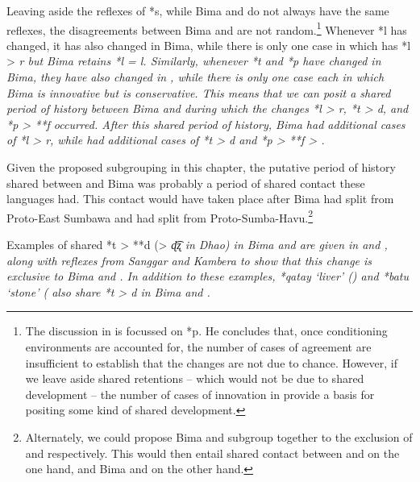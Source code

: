 Leaving aside the reflexes of *s,
while Bima and  do not always have the same reflexes,
the disagreements between Bima
and  are not random.\footnote{
		The discussion in \citet[93f]{Blust2008}
		is focussed on *p.
		He concludes that, once conditioning environments are accounted
		for, the number of cases of agreement are insufficient to establish
		that the changes are not due to chance.
		However, if we leave aside shared retentions -- which
		would not be due to shared development -- the
		number of cases of innovation in \trf{03-15}
		provide a basis for positing some kind of shared development.}
Whenever  *l has changed,
it has also changed in Bima,
while there is only one case in which  has *l
> \it{r} but Bima retains *l = \it{l}.
Similarly, whenever *t and *p have changed in Bima,
they have also changed in ,
while there is only one case each in which Bima is innovative
but  is conservative.
This means that we can posit a shared period of history between
Bima and  during which the changes *l > \it{r},
*t > \it{d}, and *p > **f occurred.
After this shared period of history,
Bima had additional cases of *l > \it{r},
while  had additional cases of *t > \it{d}
and *p > **f > {\0}.

Given the proposed subgrouping in this chapter,
the putative period of history shared
between  and Bima was probably a period
of shared contact these languages had.
This contact would have taken place after
Bima had split from Proto-East Sumbawa
and  had split from Proto-Sumba-Havu.\footnote{
	Alternately, we could propose
	Bima and  subgroup together
	to the exclusion of  and  respectively.
	This would then entail shared contact between 
	and  on the one hand, and Bima
	and  on the other hand.}

Examples of shared *t > **d (> \it{ɖ͡ʐ} in Dhao) in Bima
and  are given in 
and , along with reflexes from Sanggar
and Kambera to show that this change is exclusive to Bima and .
In addition to these examples,
*qatay ‘liver’ ()
and *batu ‘stone’ ( also share *t > \it{d} in Bima and .

